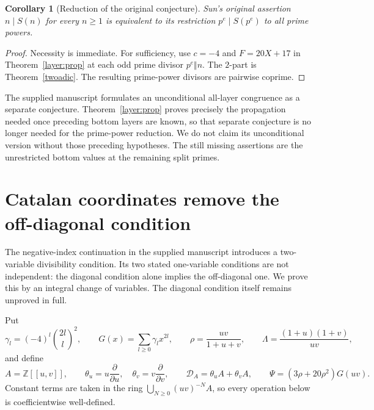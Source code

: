\documentclass[11pt,a4paper]{article}
\newtheorem{corollary}[theorem]{Corollary}
\theoremstyle{remark}\newtheorem{remark}[theorem]{Remark}
\newcommand{\Z}{\mathbb Z}
\begin{document}
\begin{corollary}[Reduction of the original conjecture]\label{layer:equiv}
Sun's original assertion \(n\mid S(n)\) for every \(n\ge1\) is equivalent
to its restriction \(p^e\mid S(p^e)\) to all prime powers.
\end{corollary}
\begin{proof}
Necessity is immediate. For sufficiency, use \(c=-4\) and
\(F=20X+17\) in Theorem~\ref{layer:prop} at each odd prime divisor
\(p^e\Vert n\). The \(2\)-part is Theorem~\ref{twoadic}.
The resulting prime-power divisors are pairwise coprime.
\end{proof}

The supplied manuscript \cite{Supplied} formulates an unconditional
all-layer congruence as a separate conjecture. Theorem~\ref{layer:prop}
proves precisely the propagation needed once preceding bottom layers
are known, so that separate conjecture is no longer needed for the
prime-power reduction. We do not claim its unconditional version
without those preceding hypotheses. The still missing assertions are
the unrestricted bottom values at the remaining split primes.

\section{Catalan coordinates remove the off-diagonal condition}
\label{cat:section}

The negative-index continuation in the supplied manuscript \cite{Supplied} introduces a
two-variable divisibility condition. Its two stated one-variable conditions
are not independent: the diagonal condition alone implies the off-diagonal
one. We prove this by an integral change of variables. The diagonal condition
itself remains unproved in full.

Put
\[
 \gamma_l=(-4)^l\binom{2l}{l}^{\!2},\qquad
 G(x)=\sum_{l\ge0}\gamma_lx^{2l},\qquad
 \rho=\frac{uv}{1+u+v},\qquad
 \Lambda=\frac{(1+u)(1+v)}{uv},
\]
and define
\[
 A=\Z[[u,v]],\qquad
 \theta_u=u\frac{\partial}{\partial u},\quad
 \theta_v=v\frac{\partial}{\partial v},\qquad
 \mathcal D_A=\theta_u A+\theta_v A,
 \qquad \Psi=(3\rho+20\rho^2)G(uv).
\]
Constant terms are taken in the ring
\(\bigcup_{N\ge0}(uv)^{-N}A\), so every operation below is coefficientwise
well-defined.
\end{document}
